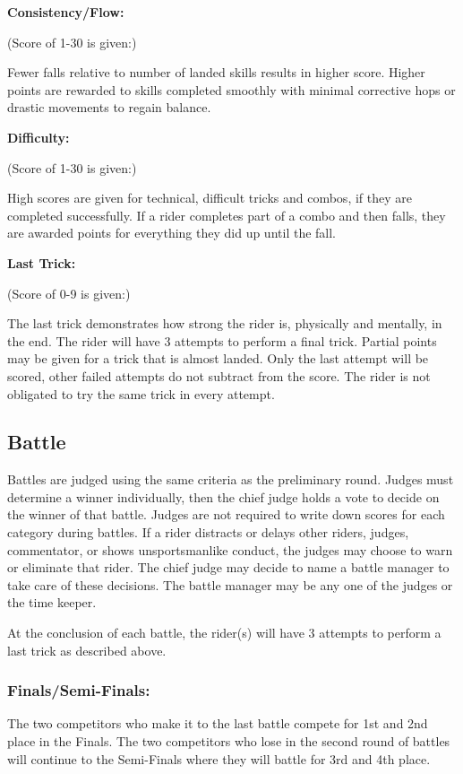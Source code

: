 \textbf{Consistency/Flow:}

(Score of 1-30 is given:)

Fewer falls relative to number of landed skills results in higher score.
Higher points are rewarded to skills completed smoothly with minimal corrective hops or drastic movements to regain balance.

\textbf{Difficulty:}

(Score of 1-30 is given:)

High scores are given for technical, difficult tricks and combos, if they are completed successfully.
If a rider completes part of a combo and then falls, they are awarded points for everything they did up until the fall. 

\textbf{Last Trick:}

(Score of 0-9 is given:)

The last trick demonstrates how strong the rider is, physically and mentally, in the end.
The rider will have 3 attempts to perform a final trick.
Partial points may be given for a trick that is almost landed.
Only the last attempt will be scored, other failed attempts do not subtract from the score.
The rider is not obligated to try the same trick in every attempt.

\subsection{Battle \label{subsec:flat-street_flatland-judging-scoring_battle}}
Battles are judged using the same criteria as the preliminary round.
Judges must determine a winner individually, then the chief judge holds a vote to decide on the winner of that battle.
Judges are not required to write down scores for each category during battles.
If a rider distracts or delays other riders, judges, commentator, or shows unsportsmanlike conduct, the judges may choose to warn or eliminate that rider.
The chief judge may decide to name a battle manager to take care of these decisions.
The battle manager may be any one of the judges or the time keeper.

At the conclusion of each battle, the rider(s) will have 3 attempts to perform a last trick as described above.

\subsubsection{Finals/Semi-Finals:}
The two competitors who make it to the last battle compete for 1st and 2nd place in the Finals.
The two competitors who lose in the second round of battles will continue to the Semi-Finals where they will battle for 3rd and 4th place.

